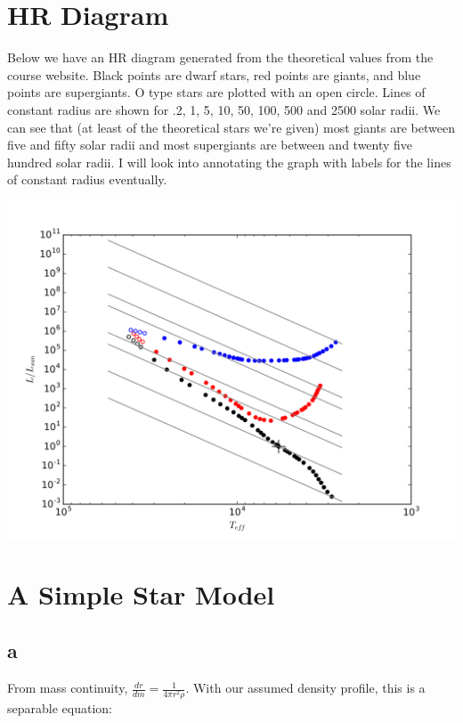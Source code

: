 \documentclass[12pt]{article}
\begin{document}
\section{HR Diagram}

Below we have an HR diagram generated from the theoretical values from the course website. Black points are dwarf stars, red points are giants, and blue points are supergiants. O type stars are plotted with an open circle. Lines of constant radius are shown for .2, 1, 5, 10, 50, 100, 500 and 2500 solar radii. We can see that (at least of the theoretical stars we're given) most giants are between five and fifty solar radii and most supergiants are between and twenty five hundred solar radii. I will look into annotating the graph with labels for the lines of constant radius eventually.

\begin{center}
\includegraphics[scale=.7]{HR.png}
\end{center}



\section{A Simple Star Model}

\subsection*{a}

From mass continuity, \(\frac{dr}{dm} = \frac{1}{4\pi r^2 \rho}\). With our assumed density profile, this is a separable equation:
\end{document}
